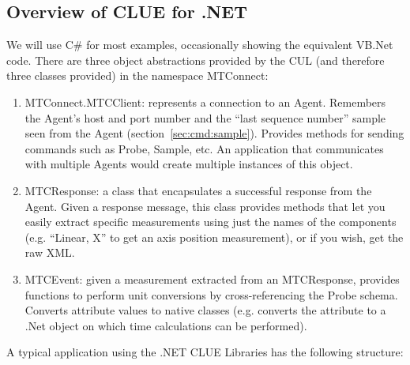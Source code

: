 \subsection{Overview of CLUE for .NET}

We will use C\# for most
examples, occasionally showing the equivalent VB.Net code.  There are
three object abstractions provided by the CUL (and therefore three
classes provided) in the namespace MTConnect:

\begin{enumerate}
\item MTConnect.MTCClient: represents a connection to an \mtc{}
  Agent. Remembers the Agent's host and port number and the ``last sequence
  number'' sample seen from the Agent (section~\ref{sec:cmd:sample}).
  Provides methods for sending commands such as Probe, Sample, etc.  An
  application that communicates with multiple Agents would create
  multiple instances of this object.
\item MTCResponse: a class that encapsulates a successful response from
  the Agent.  Given a response message, this class provides methods that
  let you easily extract specific measurements using just the names of
  the components (e.g. ``Linear, X'' to get an axis position
  measurement), or if you wish, get the raw XML.
\item MTCEvent: given a measurement extracted from an MTCResponse,
  provides functions to perform unit conversions by cross-referencing
  the Probe schema.  Converts attribute values to native
  classes (e.g. converts the  attribute to a .Net
   object on which time calculations can be performed).
\end{enumerate}

A typical application using the .NET CLUE Libraries
has the following structure:

